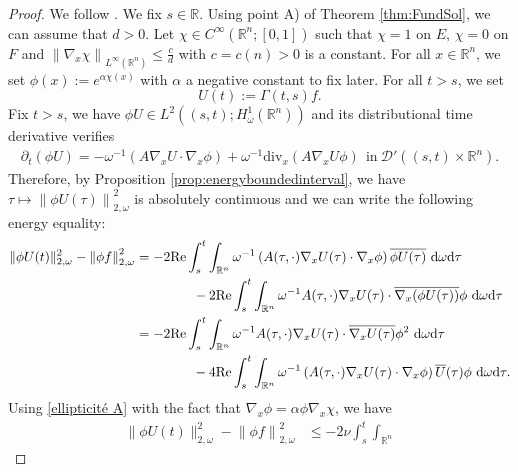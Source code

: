\documentclass[12pt, letterpaper]{amsart}
\theoremstyle{definition}
\theoremstyle{remark}
\numberwithin{equation}{section}
\begin{document}
\begin{proof}
We follow \cite[Lemma 1]{davies1992heat}. We fix $s\in \mathbb{R}$. Using point A) of Theorem \ref{thm:FundSol}, we can assume that $d>0$. Let $\chi \in C^\infty(\mathbb{R}^n;[0,1])$ such that $\chi=1$ on $E$, $\chi=0$ on $F$ and $\left\|\nabla_x \chi \right\|_{L^\infty(\mathbb{R}^n)} \leq \frac{c}{d}$ with $c=c(n)>0$ is a constant. For all $x \in \mathbb{R}^n$, we set $\phi(x):=e^{\alpha \chi(x)}$ with $\alpha$ a negative constant to fix later. For all $t>s$, we set 
\begin{equation*}
    U(t):=\Gamma(t,s)f.
\end{equation*}
Fix $t>s$, we have $\phi U \in L^2((s,t);H^1_\omega (\mathbb{R}^n))$ and its distributional time derivative verifies
\begin{align*}  
    \partial_t(\phi U) = -\omega^{-1}\left ( A \nabla_x U \cdot \nabla_x \phi \right ) +\omega^{-1} \mathrm{div}_x(A \nabla_x U \phi) \ \ \mathrm{in} \ \mathcal{D'}((s,t)\times \mathbb{R}^n).
\end{align*}
Therefore, by Proposition \ref{prop:energyboundedinterval}, we have $ \tau \mapsto \left \| \phi U(\tau) \right \|^2_{2,\omega}$ is absolutely continuous and we can write the following energy equality:
\begin{align*}
     \|\phi U(t)   \|^2_{2,\omega}-\left \|\phi f  \right \|^2_{2,\omega}&= -2\mathrm{Re}\int_{s}^{t} \int_{\mathbb{R}^n} \omega^{-1}\left (  A(\tau,\cdot)\nabla_x U(\tau)\cdot \nabla_x \phi \right )  \overline{\phi U(\tau)} \ \mathrm d \omega \mathrm d \tau \\&
     \hspace{1.5cm} -2\mathrm{Re}\int_{s}^{t} \int_{\mathbb{R}^n} \omega^{-1}A(\tau,\cdot)\nabla_x U(\tau)\cdot \overline{\nabla_x (\phi U(\tau))} \phi  \ \mathrm d \omega \mathrm d \tau
    \\&= -2\mathrm{Re}\int_{s}^{t} \int_{\mathbb{R}^n} \omega^{-1}A(\tau,\cdot)\nabla_x U(\tau)\cdot \overline{\nabla_x U(\tau)} \phi^2 \ \mathrm d \omega \mathrm d \tau 
    \\ & \hspace{1.5cm}- 4\mathrm{Re} \int_{s}^{t} \int_{\mathbb{R}^n} \omega^{-1}\left ( A(\tau,\cdot)\nabla_x U(\tau)\cdot \nabla_x \phi \right )\overline{U}(\tau) \phi \ \mathrm d \omega \mathrm d \tau.
\end{align*}
Using \eqref{ellipticité A} with the fact that $\nabla_x \phi = \alpha \phi \nabla_x \chi $, we have
\begin{align*} 
       \|\phi U(t)   \|^2_{2,\omega}-\left \| \phi f  \right \|^2_{2,\omega} &\leq -2\nu \int_{s}^{t} \int_{\mathbb{R}^n} 

\end{align*}
\end{proof}
\end{document}
